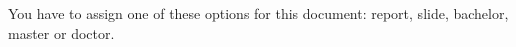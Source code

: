 \iftyp@doctor
  \def\englishdegreename{Doctor}
  \def\englishbooktitle{Doctoral Dissertation}
  \def\englishthesistype{A dissertation}
  \def\englishthesistypea{DISSERTATION}
\else
  {You have to assign one of these options for this document: report, slide, bachelor, master or doctor.}{} 
\fi
